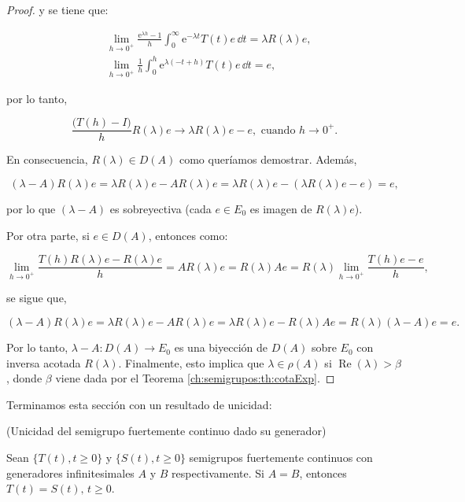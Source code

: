 \begin{proof}
    y se tiene que:

    \begin{align*}
        &\lim_{h \rightarrow 0^+} \frac{\mathrm{e}^{\lambda h} - 1}{h}\int_0^\infty \mathrm{e}^{-\lambda t}T(t)e \, \dd t = \lambda R(\lambda) e,\\
        &\lim_{h \rightarrow 0^+} \frac{1}{h}\int_0^h \mathrm{e}^{\lambda(-t + h)}T(t)e \, \dd t = e,
    \end{align*}

    por lo tanto,

    \[\frac{\big(T(h) - I\big)}{h}R(\lambda)e \rightarrow \lambda R(\lambda) e - e, \text{ cuando } h\rightarrow 0^+. \]

    En consecuencia, $R(\lambda) \in D(A)$ como queríamos demostrar. Además,

    \[
        (\lambda - A)R(\lambda)e = \lambda R(\lambda)e - AR(\lambda)e = \lambda R(\lambda)e - (\lambda R(\lambda)e - e) = e,
    \]

    por lo que $(\lambda - A)$ es sobreyectiva (cada $e \in E_0$ es imagen de $R(\lambda)e$).

    Por otra parte, si $e \in D(A)$, entonces como:

    \[
        \lim_{h\rightarrow 0^+}\frac{T(h)R(\lambda)e - R(\lambda)e}{h} = AR(\lambda)e = R(\lambda)Ae = R(\lambda)\lim_{h\rightarrow 0^+}\frac{T(h)e - e}{h},
    \]

    se sigue que,

    \[
        (\lambda - A)R(\lambda)e = \lambda R(\lambda)e - A R(\lambda)e = \lambda R(\lambda) e - R(\lambda) A e = R(\lambda)(\lambda - A)e = e.
    \]

    Por lo tanto, $\lambda - A : D(A) \rightarrow E_0$ es una biyección de $D(A)$ sobre $E_0$ con inversa acotada $R(\lambda)$. Finalmente, esto implica que $\lambda \in \rho(A)$ si $\operatorname{Re}(\lambda) > \beta$, donde $\beta$ viene dada por el Teorema \ref{ch:semigrupos:th:cotaExp}.
\end{proof}

Terminamos esta sección con un resultado de unicidad:\\

\begin{Teorema}{(Unicidad del semigrupo fuertemente continuo dado su generador)}
    \label{ch:semigrupos:th:unicidadSemigrupos}
    
    Sean $\{T(t), t\geq 0\}$ y $\{S(t), t\geq 0\}$ semigrupos fuertemente continuos con generadores infinitesimales $A$ y $B$ respectivamente. Si $A = B$, entonces $T(t) = S(t), \, t\geq 0$.
\end{Teorema}


